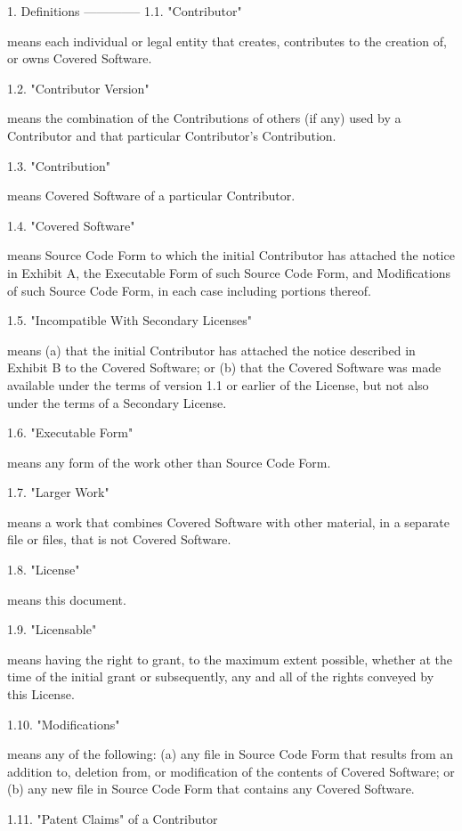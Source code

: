 \begin{DoxyVerb}1. Definitions
--------------
1.1. "Contributor"

 means each individual or legal entity that creates, contributes to
 the creation of, or owns Covered Software.

1.2. "Contributor Version"

 means the combination of the Contributions of others (if any) used
 by a Contributor and that particular Contributor's Contribution.

1.3. "Contribution"

 means Covered Software of a particular Contributor.

1.4. "Covered Software"

 means Source Code Form to which the initial Contributor has attached
 the notice in Exhibit A, the Executable Form of such Source Code
 Form, and Modifications of such Source Code Form, in each case
 including portions thereof.

1.5. "Incompatible With Secondary Licenses"

 means
 (a) that the initial Contributor has attached the notice described
 in Exhibit B to the Covered Software; or
 (b) that the Covered Software was made available under the terms of
 version 1.1 or earlier of the License, but not also under the
 terms of a Secondary License.

1.6. "Executable Form"

 means any form of the work other than Source Code Form.

1.7. "Larger Work"

 means a work that combines Covered Software with other material, in
 a separate file or files, that is not Covered Software.

1.8. "License"

 means this document.

1.9. "Licensable"

 means having the right to grant, to the maximum extent possible,
 whether at the time of the initial grant or subsequently, any and
 all of the rights conveyed by this License.

1.10. "Modifications"

 means any of the following:
 (a) any file in Source Code Form that results from an addition to,
 deletion from, or modification of the contents of Covered
 Software; or
 (b) any new file in Source Code Form that contains any Covered
 Software.

1.11. "Patent Claims" of a Contributor


\end{DoxyVerb}
